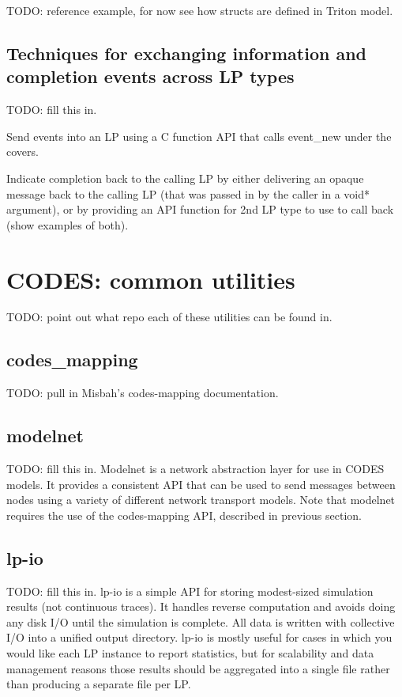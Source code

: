 \documentclass[conference,10pt,compsocconf,onecolumn]{IEEEtran}
\begin{document}
TODO: reference example, for now see how structs are defined in Triton
model.

\subsection{Techniques for exchanging information and completion events
across LP types}
\label{sec:completion}

TODO: fill this in.

Send events into an LP using a C function API that calls event\_new under
the covers.

Indicate completion back to the calling LP by either delivering an opaque 
message back to the calling LP (that was passed in by the caller in a void*
argument), or by providing an API function for 2nd LP type to
use to call back (show examples of both).

\section{CODES: common utilities}

TODO: point out what repo each of these utilities can be found in.

\subsection{codes\_mapping}
\label{sec:mapping}

TODO: pull in Misbah's codes-mapping documentation.

\subsection{modelnet}

TODO: fill this in.  Modelnet is a network abstraction layer for use in
CODES models.  It provides a consistent API that can be used to send
messages between nodes using a variety of different network transport
models.  Note that modelnet requires the use of the codes-mapping API,
described in previous section.

\subsection{lp-io}

TODO: fill this in.  lp-io is a simple API for storing modest-sized
simulation results (not continuous traces).  It handles reverse computation
and avoids doing any disk I/O until the simulation is complete.  All data is
written with collective I/O into a unified output directory.  lp-io is
mostly useful for cases in which you would like each LP instance to report
statistics, but for scalability and data management reasons those results
should be aggregated into a single file rather than producing a separate
file per LP.
\end{document}
